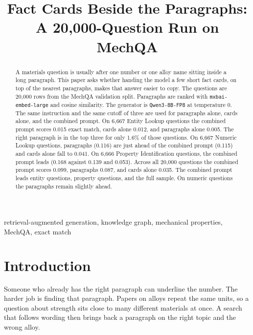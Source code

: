 \documentclass[conference]{IEEEtran}
\begin{document}
\title{Fact Cards Beside the Paragraphs:\\
A 20,000-Question Run on MechQA}

\author{
\and
{}
}

\maketitle

\begin{abstract}
A materials question is usually after one number or one alloy name sitting inside a long paragraph. This paper asks whether handing the model a few short fact cards, on top of the nearest paragraphs, makes that answer easier to copy. The questions are 20{,}000 rows from the MechQA validation split. Paragraphs are ranked with \texttt{mxbai-embed-large} and cosine similarity. The generator is \texttt{Qwen3-8B-FP8} at temperature 0. The same instruction and the same cutoff of three are used for paragraphs alone, cards alone, and the combined prompt. On 6{,}667 Entity Lookup questions the combined prompt scores 0.015 exact match, cards alone 0.012, and paragraphs alone 0.005. The right paragraph is in the top three for only 1.6\% of those questions. On 6{,}667 Numeric Lookup questions, paragraphs (0.116) are just ahead of the combined prompt (0.115) and cards alone fall to 0.041. On 6{,}666 Property Identification questions, the combined prompt leads (0.168 against 0.139 and 0.053). Across all 20{,}000 questions the combined prompt scores 0.099, paragraphs 0.087, and cards alone 0.035. The combined prompt leads entity questions, property questions, and the full sample. On numeric questions the paragraphs remain slightly ahead.
\end{abstract}

\begin{IEEEkeywords}
retrieval-augmented generation, knowledge graph, mechanical properties, MechQA, exact match
\end{IEEEkeywords}

\section{Introduction}
Someone who already has the right paragraph can underline the number. The harder job is finding that paragraph. Papers on alloys repeat the same units, so a question about strength sits close to many different materials at once. A search that follows wording then brings back a paragraph on the right topic and the wrong alloy.
\end{document}
